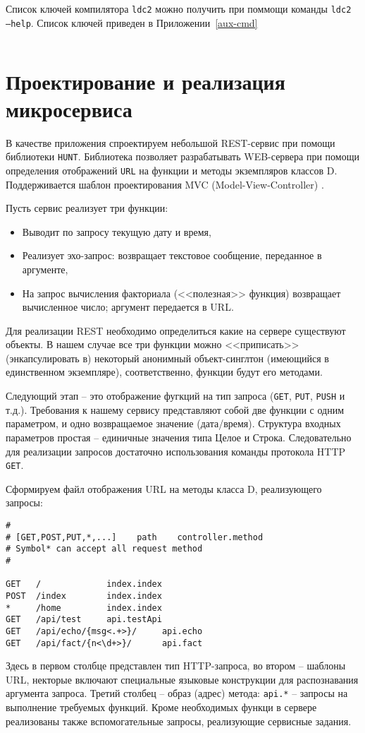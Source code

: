 \documentclass{studrep}
\begin{document}
Список ключей компилятора \texttt{ldc2} можно получить при поммощи команды \texttt{ldc2 --help}. Список ключей приведен в Приложении~\ref{aux-cmd}

\begin{verbatim}

\end{verbatim}

\chapter{Проектирование и реализация микросервиса}

В качестве приложения спроектируем небольшой REST-сервис при помощи библиотеки \texttt{HUNT}.  Библиотека позволяет разрабатывать WEB-сервера при помощи определения отображений \texttt{URL} на функции и методы экземпляров классов D.  Поддерживается шаблон проектирования MVC (Model-View-Controller) \cite{mvc}.

Пусть сервис реализует три функции:
\begin{itemize}
\item Выводит по запросу текущую дату и время,
\item Реализует эхо-запрос: возвращает текстовое сообщение, переданное в аргументе,
\item На запрос вычисления факториала (<<полезная>> функция) возвращает вычисленное число; аргумент передается в URL.
\end{itemize}

Для реализации REST необходимо определиться какие на сервере существуют объекты.  В нашем случае все три функции можно <<приписать>> (энкапсулировать в) некоторый анонимный объект-синглтон (имеющийся в единственном экземпляре), соответственно, функции будут его методами.

Следующий этап -- это отображение фугкций на тип запроса (\texttt{GET}, \texttt{PUT}, \texttt{PUSH} и т.д.).  Требования к нашему сервису представляют собой две функции с одним параметром, и одно возвращаемое значение (дата/время).  Структура входных параметров простая -- единичные значения типа Целое и Строка.  Следовательно для реализации запросов достаточно использования команды протокола HTTP \texttt{GET}.


Сформируем файл отображения URL на методы класса D, реализующего запросы:
\begin{verbatim}
#
# [GET,POST,PUT,*,...]    path    controller.method
# Symbol* can accept all request method
#

GET   /             index.index
POST  /index        index.index
*     /home         index.index
GET   /api/test     api.testApi
GET   /api/echo/{msg<.+>}/     api.echo
GET   /api/fact/{n<\d+>}/      api.fact
\end{verbatim}
Здесь в первом столбце представлен тип HTTP-запроса, во втором -- шаблоны URL, некторые включают специальные языковые конструкции для распознавания аргумента запроса. Третий столбец -- образ (адрес) метода: \texttt{api.*} -- запросы на выполнение требуемых функций.  Кроме необходимых функци в сервере реализованы также вспомогательные запросы, реализующие сервисные задания.
\end{document}
